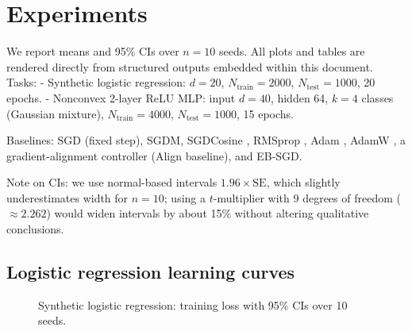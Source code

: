 \section{Experiments}
We report means and 95\% CIs over $n{=}10$ seeds. All plots and tables are rendered directly from structured outputs embedded within this document. Tasks:
- Synthetic logistic regression: $d{=}20$, $N_{\text{train}}{=}2000$, $N_{\text{test}}{=}1000$, 20 epochs.
- Nonconvex 2-layer ReLU MLP: input $d{=}40$, hidden 64, $k{=}4$ classes (Gaussian mixture), $N_{\text{train}}{=}4000$, $N_{\text{test}}{=}1000$, 15 epochs.

Baselines: SGD (fixed step), SGDM, SGDCosine \cite{Loshchilov2017SGDRICLR}, RMSprop \cite{Tieleman2012RMSprop}, Adam \cite{Kingma2015AdamICLR}, AdamW \cite{Loshchilov2019AdamWICLR}, a gradient-alignment controller (Align baseline), and EB-SGD.

Note on CIs: we use normal-based intervals $1.96\times \text{SE}$, which slightly underestimates width for $n{=}10$; using a $t$-multiplier with 9 degrees of freedom ($\approx 2.262$) would widen intervals by about 15\% without altering qualitative conclusions.

\subsection{Logistic regression learning curves}
\begin{figure}[H]
\centering
\begin{adjustbox}{width=\linewidth}
\end{adjustbox}
\caption{Synthetic logistic regression: training loss with 95\% CIs over 10 seeds.}
\label{fig:loss}
\end{figure}


